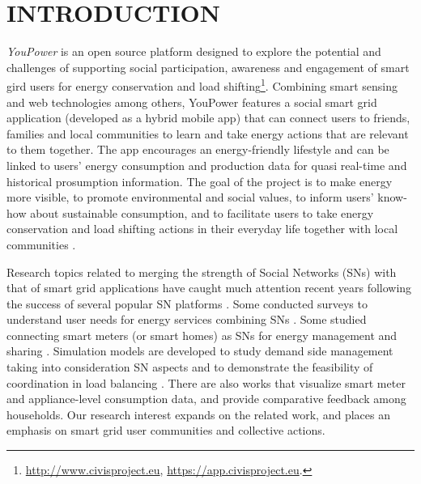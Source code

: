 \section{\uppercase{Introduction}}
\label{sec:introduction}

\noindent 
\textit{YouPower} is an open source platform designed to explore the potential and challenges of supporting social participation, awareness and engagement of smart gird users for energy conservation and load shifting\footnote{\url{http://www.civisproject.eu}, \url{https://app.civisproject.eu}.}. Combining smart sensing and web technologies among others,
YouPower features a social smart grid application (developed as a hybrid mobile app) that can connect users to friends, families and local communities to learn and take energy actions that are relevant to them together. The app encourages an energy-friendly lifestyle and can be linked to users' energy consumption and production data for quasi real-time and historical prosumption information. 
% 
The goal of the project is to make energy more visible, to promote environmental and social values, to inform users' know-how about sustainable consumption, and to facilitate users to take energy conservation and load shifting actions in their everyday life together with local communities \cite{Huang2014,Huang2015c,Huang2016}. 
%  

Research topics related to merging the strength of Social Networks (SNs) with that of smart grid applications have caught much attention recent years following the success of several popular SN platforms \cite{Boslet2010,Chima2011,Erickson2012,Fang2013,Huang2015}. 
% 
Some conducted surveys to understand user needs for energy services combining SNs \cite{Silva2012}. Some studied connecting smart meters (or smart homes) as SNs for
energy management and sharing \cite{Ciuciu2012,Steinheimer2012}. 
Simulation models are developed to study demand side management %
taking into consideration SN aspects \cite{De-Haan2011,Lei2012,Chatzidimitriou2013} and to demonstrate the feasibility of
coordination in load balancing \cite{Worm2013,Skopik2014}. There are also works that visualize smart meter and appliance-level consumption data, and provide comparative feedback among households\cite{Petkov2011,Weiss2012,Dillahunt2014}.
% 
Our research interest expands on the related work, and places an emphasis on smart grid user communities and collective actions. 

